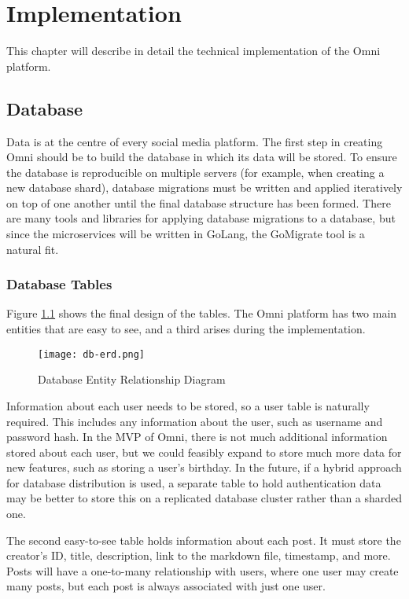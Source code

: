 \chapter{Implementation}
\label{cha:implementation}

This chapter will describe in detail the technical implementation of the Omni platform.

\section{Database}
\label{sec:impl-database}
Data is at the centre of every social media platform. The first step in creating Omni should be to build the database in which its data will be stored.
To ensure the database is reproducible on multiple servers (for example, when creating a new database shard), database migrations must be written and applied iteratively on top of one another until the final database structure has been formed. 
There are many tools and libraries for applying database migrations to a database, but since the microservices will be written in GoLang, the GoMigrate tool is a natural fit.

\subsection{Database Tables}
Figure \ref{fig:db-erd} shows the final design of the tables. The Omni platform has two main entities that are easy to see, and a third arises during the implementation.

\begin{figure}[htbp]
\texttt{[image: db-erd.png]}
\centering
\caption{Database Entity Relationship Diagram}
\label{fig:db-erd}
\end{figure}

Information about each user needs to be stored, so a user table is naturally required. This includes any information about the user, such as username and password hash.
In the MVP of Omni, there is not much additional information stored about each user, but we could feasibly expand to store much more data for new features, such as storing a user's birthday.
In the future, if a hybrid approach for database distribution is used, a separate table to hold authentication data may be better to store this on a replicated database cluster rather than a sharded one.

The second easy-to-see table holds information about each post. It must store the creator's ID, title, description, link to the markdown file, timestamp, and more.
Posts will have a one-to-many relationship with users, where one user may create many posts, but each post is always associated with just one user. 

